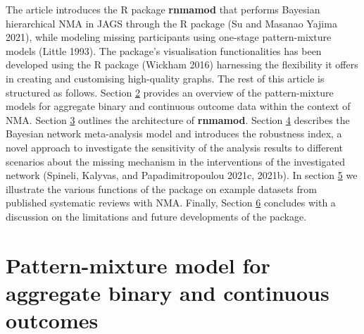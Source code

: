 The article introduces the R package \textbf{rnmamod} that performs Bayesian
hierarchical NMA in JAGS through the R package  (Su and Masanao Yajima 2021),
while modeling missing participants using one-stage pattern-mixture models (Little 1993).
The package's visualisation functionalities has been developed using the R package
 (Wickham 2016) harnessing the flexibility it offers in creating
and customising high-quality graphs. The rest of this article is structured as
follows. Section \protect\hyperlink{Pattern-mixture-models-for-aggregate-binary-and-continuous-outcomes}{2}
provides an overview of the pattern-mixture models for aggregate binary and continuous
outcome data within the context of NMA. Section \protect\hyperlink{The-architecture-of-ux2fpkgux5cux257Brnmamodux5cux257D}{3}
outlines the architecture of \textbf{rnmamod}. Section \protect\hyperlink{Bayesian-network-meta-analysis-model}{4}
describes the Bayesian network meta-analysis model and introduces the robustness
index, a novel approach to investigate the sensitivity of the analysis results to
different scenarios about the missing mechanism in the interventions of the investigated
network (Spineli, Kalyvas, and Papadimitropoulou 2021c, 2021b).
In section \protect\hyperlink{Using-the-ux2fpkgux5cux257Brnmamodux5cux257D-R-package}{5} we illustrate the various functions of the package on example
datasets from published systematic reviews with NMA. Finally, Section \protect\hyperlink{Discussion}{6}
concludes with a discussion on the limitations and future developments of the package.

\hypertarget{pattern-mixture-model-for-aggregate-binary-and-continuous-outcomes}{%
\section{Pattern-mixture model for aggregate binary and continuous outcomes}\label{pattern-mixture-model-for-aggregate-binary-and-continuous-outcomes}}

